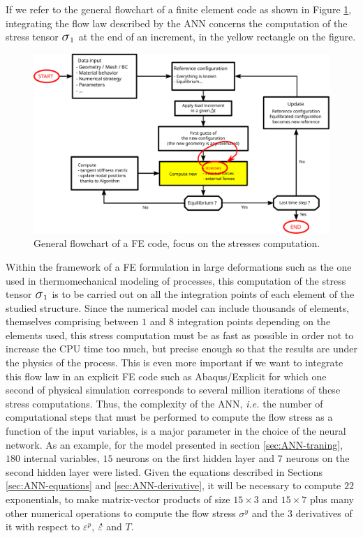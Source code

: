 \documentclass[algorithms,article,submit,pdftex,moreauthors]{Definitions/mdpi}
\makeatletter
\DeclareRobustCommand{\Sig}{\mbox{\Large\ensuremath{\sigma}}}
\DeclareRobustCommand{\mdot}[1]{\accentset{\mbox{\bfseries .}}{#1}}
\DeclareRobustCommand{\ie}{\emph{i.e.}\@\xspace}
\makeatother
\begin{document}
If we refer to the general flowchart of a finite element code as shown in Figure \ref{fig:StressUpdate}, integrating the flow law described by the ANN concerns the computation of the stress tensor $\Sig_1$ at the end of an increment, in the yellow rectangle on the figure.
\begin{figure}[!ht]
\centering
\includegraphics[width=0.9\columnwidth]{Figures/StressUpdate}
\caption{General flowchart of a FE code, focus on the stresses computation.}
\label{fig:StressUpdate}
\end{figure}
Within the framework of a FE formulation in large deformations such as the one used in thermomechanical modeling of processes, this computation of the stress tensor $\Sig_1$ is to be carried out on all the integration points of each element of the studied structure.
Since the numerical model can include thousands of elements, themselves comprising between $1$ and $8$ integration points depending on the elements used, this stress computation must be as fast as possible in order not to increase the CPU time too much, but precise enough so that the results are under the physics of the process.
This is even more important if we want to integrate this flow law in an explicit FE code such as Abaqus/Explicit for which one second of physical simulation corresponds to several million iterations of these stress computations.
Thus, the complexity of the ANN, \ie the number of computational steps that must be performed to compute the flow stress as a function of the input variables, is a major parameter in the choice of the neural network.
As an example, for the model presented in section \ref{sec:ANN-traning}, $180$ internal variables, $15$ neurons on the first hidden layer and $7$ neurons on the second hidden layer were listed.
Given the equations described in Sections \ref{sec:ANN-equations} and \ref{sec:ANN-derivative}, it will be necessary to compute $22$ exponentials, to make matrix-vector products of size $15\times3$ and $15\times7$ plus many other numerical operations to compute the flow stress $\sigma^y$ and the $3$ derivatives of it with respect to $\varepsilon^p$, $\mdot\varepsilon$ and $T$.
\end{document}
